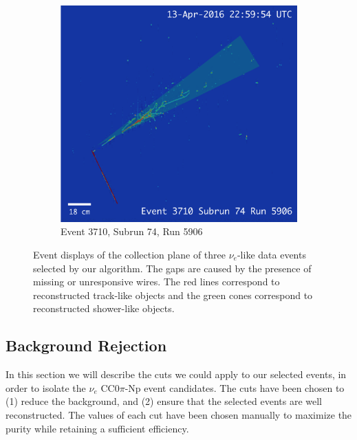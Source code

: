 \begin{figure}[htbp]
  \begin{subfigure}{0.45\textwidth}	
  \includegraphics[width=\linewidth]{figures/data1.png}
  \caption{Event 3710, Subrun 74, Run 5906}
\end{subfigure}

  \caption{Event displays of the collection plane of three $\nu_{e}$-like data events selected by our algorithm. The gaps are caused by the presence of missing or unresponsive wires. The red lines correspond to reconstructed track-like objects and the green cones correspond to reconstructed shower-like objects. }
  \label{fig:evds}
\end{figure}



\subsection{Background Rejection}\label{sec:bkg}
In this section we will describe the cuts we could apply to our selected events, in order to isolate the $\nu_{e}$ CC$0\pi$-Np event candidates. The cuts have been chosen to (1) reduce the background, and (2) ensure that the selected events are well reconstructed. The values of each cut have been chosen manually to maximize the purity while retaining a sufficient efficiency. %


